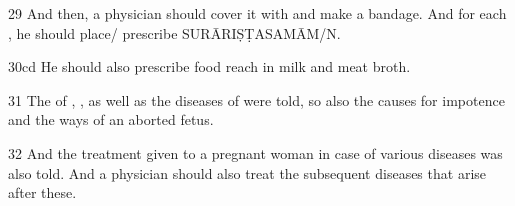 \begin{translation}
\item [29] 
And then, a physician should cover it with  and make a bandage. 
And for each , he should place/ prescribe 
SURĀRIṢṬASAMĀM/N.

\item [30cd]
He should also prescribe food reach in milk and meat broth.

\item [31]
The  of , , 
 as well as the diseases of  were told, so also the 
causes for impotence and the ways of an aborted fetus. 

\item [32] 
And the treatment given to a pregnant woman in case of various diseases was also told.
And a physician should also treat the subsequent diseases that 
arise after these.  

\end{translation}
